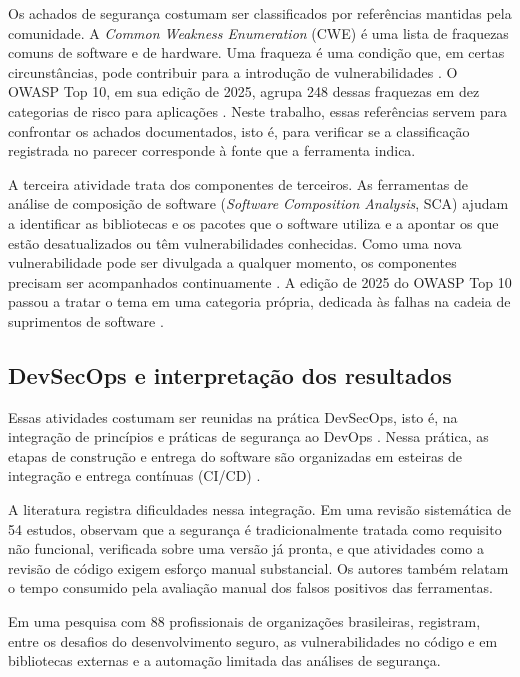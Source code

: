 Os achados de segurança costumam ser classificados por referências mantidas pela comunidade. A \textit{Common Weakness Enumeration} (CWE) é uma lista de fraquezas comuns de software e de hardware. Uma fraqueza é uma condição que, em certas circunstâncias, pode contribuir para a introdução de vulnerabilidades \cite{cweAbout}. O OWASP Top 10, em sua edição de 2025, agrupa 248 dessas fraquezas em dez categorias de risco para aplicações \cite{owaspTop10}. Neste trabalho, essas referências servem para confrontar os achados documentados, isto é, para verificar se a classificação registrada no parecer corresponde à fonte que a ferramenta indica.

A terceira atividade trata dos componentes de terceiros. As ferramentas de análise de composição de software (\textit{Software Composition Analysis}, SCA) ajudam a identificar as bibliotecas e os pacotes que o software utiliza e a apontar os que estão desatualizados ou têm vulnerabilidades conhecidas. Como uma nova vulnerabilidade pode ser divulgada a qualquer momento, os componentes precisam ser acompanhados continuamente \cite{blackIr8397}. A edição de 2025 do OWASP Top 10 passou a tratar o tema em uma categoria própria, dedicada às falhas na cadeia de suprimentos de software \cite{owaspTop10}.

\subsection{DevSecOps e interpretação dos resultados}
\label{rt-2-1-3}

Essas atividades costumam ser reunidas na prática DevSecOps, isto é, na integração de princípios e práticas de segurança ao DevOps \cite{rajapakse2022}. Nessa prática, as etapas de construção e entrega do software são organizadas em esteiras de integração e entrega contínuas (CI/CD) \cite{chandramouli2024}.

A literatura registra dificuldades nessa integração. Em uma revisão sistemática de 54 estudos,  observam que a segurança é tradicionalmente tratada como requisito não funcional, verificada sobre uma versão já pronta, e que atividades como a revisão de código exigem esforço manual substancial. Os autores também relatam o tempo consumido pela avaliação manual dos falsos positivos das ferramentas.

Em uma pesquisa com 88 profissionais de organizações brasileiras,  registram, entre os desafios do desenvolvimento seguro, as vulnerabilidades no código e em bibliotecas externas e a automação limitada das análises de segurança.

